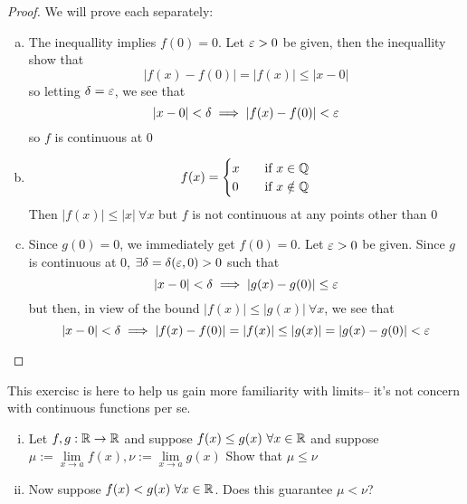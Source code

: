 \begin{proof}
    We will prove each separately:
    \begin{enumerate}[(a)]
        \item The inequallity implies $f(0) = 0$. Let $\varepsilon > 0$ be given, then the inequallity show that
        $$|f(x) - f(0)| = |f(x)| \leq |x - 0|$$
        so letting $\delta = \varepsilon$, we see that
        $$|x-0| < \delta \implies |f(x) - f(0)| < \varepsilon$$
        so $f$ is continuous at $0$
        \item \[ f(x) =
            \begin{cases}
            x       & \quad \text{if } x \in \mathbb Q \\
            0       & \quad \text{if } x \notin \mathbb Q
            \end{cases}
        \]
        Then $|f(x)| \leq |x|\ \forall x$ but $f$ is not continuous at any points other than $0$
        \item Since $g(0) = 0$, we immediately get $f(0) = 0$. Let $\varepsilon > 0$ be given.
        Since $g$ is continuous at $0$, $\exists \delta = \delta(\varepsilon, 0) > 0$ such that
        $$|x - 0| < \delta \implies |g(x) - g(0)| \leq \varepsilon$$
        but then, in view of the bound $|f(x)| \leq |g(x)|\ \forall x$, we see that
        $$|x - 0| < \delta \implies |f(x) - f(0)| = |f(x)| \leq |g(x)| = |g(x)-g(0)| < \varepsilon$$
    \end{enumerate} 
\end{proof}

\begin{example}
    This exercisc is here to help us gain more familiarity with limits-- it's not concern with 
    continuous functions per se.
    \begin{enumerate}[(i)]
        \item Let $f, g: \mathbb R \to \mathbb R$ and suppose $f(x) \leq g(x)\ \forall x \in \mathbb R$ and suppose 
        $\mu := \lim\limits_{x\to a} f(x), \nu := \lim\limits_{x\to a}g(x)$
        Show that $\mu \leq \nu$
        \item Now suppose $f(x) < g(x)\ \forall x \in \mathbb R$. Does this guarantee $\mu < \nu$?
    \end{enumerate}
\end{example}

